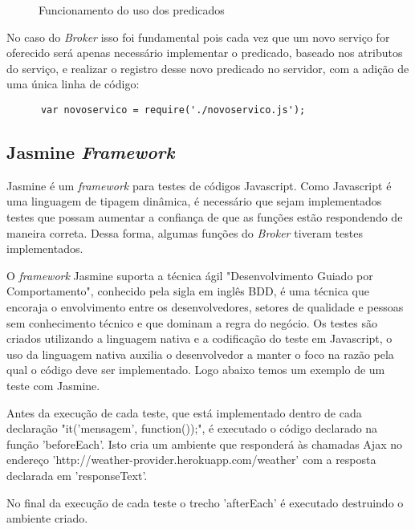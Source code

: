 \begin{figure}[h]
  \center
  \qquad
  \caption[Funcionamento do uso dos predicados]{Funcionamento do uso dos predicados}
  \label{fig:novosservicos}
\end{figure}

No caso do \textit{Broker} isso foi fundamental pois cada vez que um novo serviço for oferecido será apenas necessário implementar o predicado, baseado nos atributos do serviço, e realizar o registro desse novo predicado no servidor, com a adição de uma única linha de código:

\begin{verbatim}
      var novoservico = require('./novoservico.js');
\end{verbatim}

\subsection{Jasmine \normalfont\itshape Framework}
Jasmine é um \textit{framework} para testes de códigos Javascript. Como Javascript é uma linguagem de tipagem dinâmica, é necessário que sejam implementados testes que possam aumentar a confiança de que as funções estão respondendo de maneira correta.
Dessa forma, algumas funções do \textit{Broker} tiveram testes implementados.

O \textit{framework} Jasmine suporta a técnica ágil "Desenvolvimento Guiado por Comportamento", conhecido pela sigla em inglês BDD, é uma técnica que encoraja o envolvimento entre os desenvolvedores, setores de qualidade e pessoas sem conhecimento técnico e que dominam a regra do negócio. Os testes são criados utilizando a linguagem nativa e a codificação do teste em Javascript, o uso da linguagem nativa auxilia o desenvolvedor a manter o foco na razão pela qual o código deve ser implementado.
Logo abaixo temos um exemplo de um teste com Jasmine.

Antes da execução de cada teste, que está implementado dentro de cada declaração "it('mensagem', function(){});", é executado o código declarado na função 'beforeEach'. Isto cria um ambiente que responderá às chamadas Ajax no endereço 'http://weather-provider.herokuapp.com/weather' com a resposta declarada em 'responseText'.

No final da execução de cada teste o trecho 'afterEach' é executado destruindo o ambiente criado.

